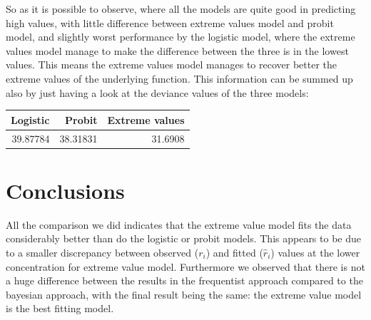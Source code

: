 \documentclass[]{article}
\newenvironment{Shaded}{\begin{snugshade}}{\end{snugshade}}
\newcommand{\DataTypeTok}[1]{\textcolor[rgb]{0.13,0.29,0.53}{#1}}
\newcommand{\KeywordTok}[1]{\textcolor[rgb]{0.13,0.29,0.53}{\textbf{#1}}}
\newcommand{\NormalTok}[1]{#1}
\newcommand{\OperatorTok}[1]{\textcolor[rgb]{0.81,0.36,0.00}{\textbf{#1}}}
\newcommand{\StringTok}[1]{\textcolor[rgb]{0.31,0.60,0.02}{#1}}
\begin{document}
So as it is possible to observe, where all the models are quite good in
predicting high values, with little difference between extreme values
model and probit model, and slightly worst performance by the logistic
model, where the extreme values model manage to make the difference
between the three is in the lowest values. This means the extreme values
model manages to recover better the extreme values of the underlying
function. This information can be summed up also by just having a look
at the deviance values of the three models:

\begin{Shaded}
\end{Shaded}

\begin{table}[!h]
\centering
\begin{tabular}{rrr}
\toprule
Logistic & Probit & Extreme values\\
\midrule
\rowcolor{gray!6}  39.87784 & 38.31831 & 31.6908\\
\bottomrule
\end{tabular}
\end{table}

\hypertarget{conclusions}{%
\section{Conclusions}\label{conclusions}}

All the comparison we did indicates that the extreme value model fits
the data considerably better than do the logistic or probit models. This
appears to be due to a smaller discrepancy between observed (\(r_i\))
and fitted (\(\hat{r}_i\)) values at the lower concentration for extreme
value model. Furthermore we observed that there is not a huge difference
between the results in the frequentist approach compared to the bayesian
approach, with the final result being the same: the extreme value model
is the best fitting model.
\end{document}
